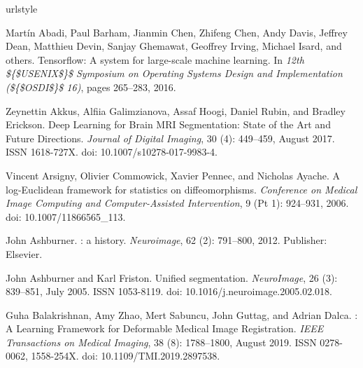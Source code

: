 \documentclass{midl}
\begin{document}
\begin{thebibliography}{50}
\providecommand{\natexlab}[1]{#1}
\providecommand{\url}[1]{\texttt{#1}}
\expandafter\ifx\csname urlstyle\endcsname\relax
  \providecommand{\doi}[1]{doi: #1}\else
  \providecommand{\doi}{doi: \begingroup \urlstyle{rm}\Url}\fi

Martín Abadi, Paul Barham, Jianmin Chen, Zhifeng Chen, Andy Davis, Jeffrey
  Dean, Matthieu Devin, Sanjay Ghemawat, Geoffrey Irving, Michael Isard, and
  {others}.
\newblock Tensorflow: {A} system for large-scale machine learning.
\newblock In \emph{12th \$\{\${USENIX}\$\}\$ {Symposium} on {Operating}
  {Systems} {Design} and {Implementation} (\$\{\${OSDI}\$\}\$ 16)}, pages
  265--283, 2016.

Zeynettin Akkus, Alfiia Galimzianova, Assaf Hoogi, Daniel Rubin, and Bradley
  Erickson.
\newblock Deep {Learning} for {Brain} {MRI} {Segmentation}: {State} of the
  {Art} and {Future} {Directions}.
\newblock \emph{Journal of Digital Imaging}, 30 (4):
  449--459, August 2017.
\newblock ISSN 1618-727X.
\newblock \doi{10.1007/s10278-017-9983-4}.

Vincent Arsigny, Olivier Commowick, Xavier Pennec, and Nicholas Ayache.
\newblock A log-{Euclidean} framework for statistics on diffeomorphisms.
\newblock \emph{Conference on Medical Image Computing and Computer-Assisted
  Intervention}, 9 (Pt 1): 924--931, 2006.
\newblock \doi{10.1007/11866565_113}.

John Ashburner.
: a history.
\newblock \emph{Neuroimage}, 62 (2): 791--800, 2012.
\newblock Publisher: Elsevier.

John Ashburner and Karl Friston.
\newblock Unified segmentation.
\newblock \emph{NeuroImage}, 26 (3): 839--851, July 2005.
\newblock ISSN 1053-8119.
\newblock \doi{10.1016/j.neuroimage.2005.02.018}.

Guha Balakrishnan, Amy Zhao, Mert Sabuncu, John Guttag, and Adrian Dalca.
: {A} {Learning} {Framework} for {Deformable} {Medical}
  {Image} {Registration}.
\newblock \emph{IEEE Transactions on Medical Imaging}, 38
  (8): 1788--1800, August 2019.
\newblock ISSN 0278-0062, 1558-254X.
\newblock \doi{10.1109/TMI.2019.2897538}.


\end{thebibliography}
\end{document}
